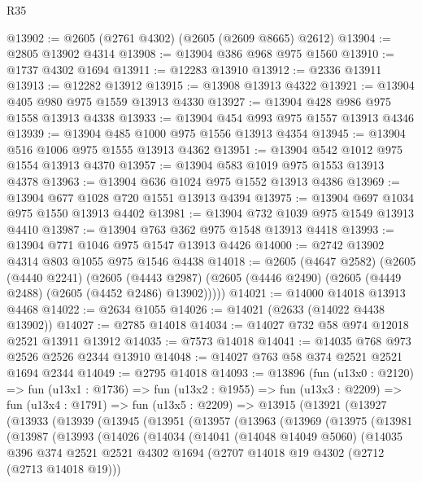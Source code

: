 \begin{lexlean}{R35}
\begin{coremodule}
@13902 := @2605 (@2761 @4302) (@2605 (@2609 @8665) @2612)
@13904 := @2805 @13902 @4314
@13908 := @13904 @386 @968 @975 @1560
@13910 := @1737 @4302 @1694
@13911 := @12283 @13910
@13912 := @2336 @13911
@13913 := @12282 @13912
@13915 := @13908 @13913 @4322
@13921 := @13904 @405 @980 @975 @1559 @13913 @4330
@13927 := @13904 @428 @986 @975 @1558 @13913 @4338
@13933 := @13904 @454 @993 @975 @1557 @13913 @4346
@13939 := @13904 @485 @1000 @975 @1556 @13913 @4354
@13945 := @13904 @516 @1006 @975 @1555 @13913 @4362
@13951 := @13904 @542 @1012 @975 @1554 @13913 @4370
@13957 := @13904 @583 @1019 @975 @1553 @13913 @4378
@13963 := @13904 @636 @1024 @975 @1552 @13913 @4386
@13969 := @13904 @677 @1028 @720 @1551 @13913 @4394
@13975 := @13904 @697 @1034 @975 @1550 @13913 @4402
@13981 := @13904 @732 @1039 @975 @1549 @13913 @4410
@13987 := @13904 @763 @362 @975 @1548 @13913 @4418
@13993 := @13904 @771 @1046 @975 @1547 @13913 @4426
@14000 := @2742 @13902 @4314 @803 @1055 @975 @1546 @4438
@14018 := @2605
    (@4647 @2582)
    (@2605
      (@4440 @2241)
      (@2605
        (@4443 @2987)
        (@2605 (@4446 @2490) (@2605 (@4449 @2488) (@2605 (@4452 @2486) @13902)))))
@14021 := @14000 @14018 @13913 @4468
@14022 := @2634 @1055
@14026 := @14021 (@2633 (@14022 @4438 @13902))
@14027 := @2785 @14018
@14034 := @14027 @732 @58 @974 @12018 @2521 @13911 @13912
@14035 := @7573 @14018
@14041 := @14035 @768 @973 @2526 @2526 @2344 @13910
@14048 := @14027 @763 @58 @374 @2521 @2521 @1694 @2344
@14049 := @2795 @14018
@14093 := @13896
    (fun (u13x0 : @2120) =>
    fun (u13x1 : @1736) =>
    fun (u13x2 : @1955) =>
    fun (u13x3 : @2209) =>
    fun (u13x4 : @1791) =>
    fun (u13x5 : @2209) =>
    @13915
      (@13921
        (@13927
          (@13933
            (@13939
              (@13945
                (@13951
                  (@13957
                    (@13963
                      (@13969
                        (@13975
                          (@13981
                            (@13987
                              (@13993
                                (@14026
                                  (@14034
                                    (@14041
                                      (@14048 @14049 @5060)
                                      (@14035
                                        @396
                                        @374
                                        @2521
                                        @2521
                                        @4302
                                        @1694
                                        (@2707 @14018 @19 @4302 (@2712 (@2713 @14018 @19)))

\end{coremodule}
\end{lexlean}
